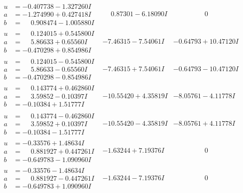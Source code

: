 \documentclass[1p]{elsarticle_modified}
\theoremstyle{definition}
\begin{document}
$$\begin{array}{c|c|c}
\begin{aligned}
u &= -0.407738 - 1.327260 I \\
a &= -1.274990 + 0.427418 I \\
b &= \phantom{-}0.908474 - 1.005880 I\end{aligned}
 & \phantom{-}0.87301 - 6.18090 I & \phantom{-0.000000 } 0 \\ \hline\begin{aligned}
u &= \phantom{-}0.124015 + 0.545800 I \\
a &= \phantom{-}5.86633 + 0.65560 I \\
b &= -0.470298 + 0.854986 I\end{aligned}
 & -7.46315 - 7.54061 I & -0.64793 + 10.47120 I \\ \hline\begin{aligned}
u &= \phantom{-}0.124015 - 0.545800 I \\
a &= \phantom{-}5.86633 - 0.65560 I \\
b &= -0.470298 - 0.854986 I\end{aligned}
 & -7.46315 + 7.54061 I & -0.64793 - 10.47120 I \\ \hline\begin{aligned}
u &= \phantom{-}0.143774 + 0.462860 I \\
a &= \phantom{-}3.59852 - 0.10397 I \\
b &= -0.10384 + 1.51777 I\end{aligned}
 & -10.55420 + 4.35819 I & -8.05761 - 4.11778 I \\ \hline\begin{aligned}
u &= \phantom{-}0.143774 - 0.462860 I \\
a &= \phantom{-}3.59852 + 0.10397 I \\
b &= -0.10384 - 1.51777 I\end{aligned}
 & -10.55420 - 4.35819 I & -8.05761 + 4.11778 I \\ \hline\begin{aligned}
u &= -0.33576 + 1.48634 I \\
a &= \phantom{-}0.881927 + 0.447261 I \\
b &= -0.649783 - 1.090960 I\end{aligned}
 & -1.63244 + 7.19376 I & \phantom{-0.000000 } 0 \\ \hline\begin{aligned}
u &= -0.33576 - 1.48634 I \\
a &= \phantom{-}0.881927 - 0.447261 I \\
b &= -0.649783 + 1.090960 I\end{aligned}
 & -1.63244 - 7.19376 I & \phantom{-0.000000 } 0 \\ \hline\begin{aligned}

\end{aligned}
\end{array}$$
\end{document}
